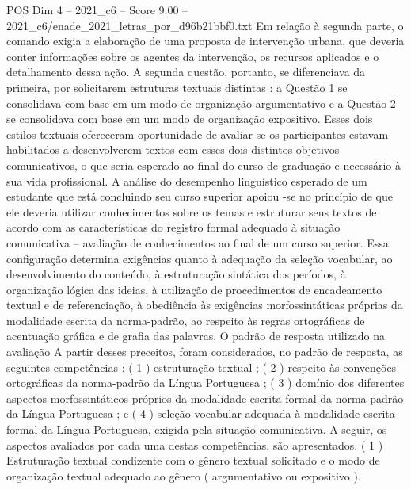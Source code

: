 \begin{textsample}{POS Dim 4 – 2021\_c6 – Score 9.00 – 2021\_c6/enade\_2021\_letras\_por\_d96b21bbf0.txt}
Em relação à segunda parte, o comando exigia a elaboração de uma proposta de intervenção urbana, que deveria conter informações sobre os agentes da intervenção, os recursos aplicados e o detalhamento dessa ação.
A segunda questão, portanto, se diferenciava da primeira, por solicitarem estruturas textuais distintas : a Questão 1 se consolidava com base em um modo de organização argumentativo e a Questão 2 se consolidava com base em um modo de organização expositivo.
Esses dois estilos textuais ofereceram oportunidade de avaliar se os participantes estavam habilitados a desenvolverem textos com esses dois distintos objetivos comunicativos, o que seria esperado ao final do curso de graduação e necessário à sua vida profissional.
A análise do desempenho linguístico esperado de um estudante que está concluindo seu curso superior apoiou -se no princípio de que ele deveria utilizar conhecimentos sobre os temas e estruturar seus textos de acordo com as características do registro formal adequado à situação comunicativa – avaliação de conhecimentos ao final de um curso superior.
Essa configuração determina exigências quanto à adequação da seleção vocabular, ao desenvolvimento do conteúdo, à estruturação sintática dos períodos, à organização lógica das ideias, à utilização de procedimentos de encadeamento textual e de referenciação, à obediência às exigências morfossintáticas próprias da modalidade escrita da norma-padrão, ao respeito às regras ortográficas de acentuação gráfica e de grafia das palavras.
O padrão de resposta utilizado na avaliação A partir desses preceitos, foram considerados, no padrão de resposta, as seguintes competências : ( 1 ) estruturação textual ; ( 2 ) respeito às convenções ortográficas da norma-padrão da Língua Portuguesa ; ( 3 ) domínio dos diferentes aspectos morfossintáticos próprios da modalidade escrita formal da norma-padrão da Língua Portuguesa ; e ( 4 ) seleção vocabular adequada à modalidade escrita formal da Língua Portuguesa, exigida pela situação comunicativa.
A seguir, os aspectos avaliados por cada uma destas competências, são apresentados. ( 1 ) Estruturação textual condizente com o gênero textual solicitado e o modo de organização textual adequado ao gênero ( argumentativo ou expositivo ).

\end{textsample}
